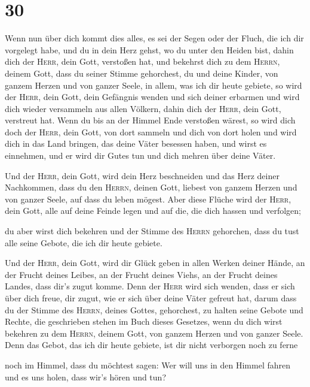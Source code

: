 \hypertarget{section-29}{%
\section{30}\label{section-29}}

 Wenn nun über dich kommt dies alles, es sei der Segen
oder der Fluch, die ich dir vorgelegt habe, und du in dein Herz gehst,
wo du unter den Heiden bist, dahin dich der \textsc{Herr}, dein Gott,
verstoßen hat,  und bekehrst dich zu dem \textsc{Herrn},
deinem Gott, dass du seiner Stimme gehorchest, du und deine Kinder, von
ganzem Herzen und von ganzer Seele, in allem, was ich dir heute gebiete,
 so wird der \textsc{Herr}, dein Gott, dein Gefängnis
wenden und sich deiner erbarmen und wird dich wieder versammeln aus
allen Völkern, dahin dich der \textsc{Herr}, dein Gott, verstreut hat.
 Wenn du bis an der Himmel Ende verstoßen wärest, so wird
dich doch der \textsc{Herr}, dein Gott, von dort sammeln und dich von
dort holen  und wird dich in das Land bringen, das deine
Väter besessen haben, und wirst es einnehmen, und er wird dir Gutes tun
und dich mehren über deine Väter.

 Und der \textsc{Herr}, dein Gott, wird dein Herz
beschneiden und das Herz deiner Nachkommen, dass du den \textsc{Herrn},
deinen Gott, liebest von ganzem Herzen und von ganzer Seele, auf dass du
leben mögest.  Aber diese Flüche wird der \textsc{Herr},
dein Gott, alle auf deine Feinde legen und auf die, die dich hassen und
verfolgen;

 du aber wirst dich bekehren und der Stimme des
\textsc{Herrn} gehorchen, dass du tust alle seine Gebote, die ich dir
heute gebiete.

 Und der \textsc{Herr}, dein Gott, wird dir Glück geben in
allen Werken deiner Hände, an der Frucht deines Leibes, an der Frucht
deines Viehs, an der Frucht deines Landes, dass dir's zugut komme. Denn
der \textsc{Herr} wird sich wenden, dass er sich über dich freue, dir
zugut, wie er sich über deine Väter gefreut hat,  darum
dass du der Stimme des \textsc{Herrn}, deines Gottes, gehorchest, zu
halten seine Gebote und Rechte, die geschrieben stehen im Buch dieses
Gesetzes, wenn du dich wirst bekehren zu dem \textsc{Herrn}, deinem
Gott, von ganzem Herzen und von ganzer Seele.  Denn das
Gebot, das ich dir heute gebiete, ist dir nicht verborgen noch zu ferne

 noch im Himmel, dass du möchtest sagen: Wer will uns in
den Himmel fahren und es uns holen, dass wir's hören und tun?

